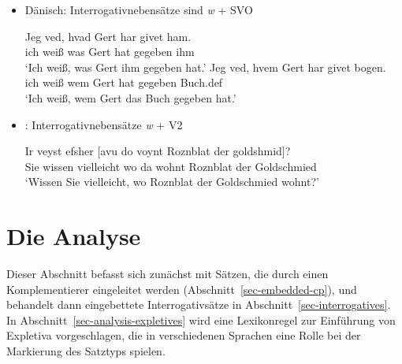 \begin{itemize}
\item Dänisch: Interrogativnebensätze sind \emph{w} + SVO

\eal
\ex
\gll Jeg ved, hvad Gert har givet ham.\\
     ich weiß was Gert  hat gegeben ihm\\
\glt `Ich weiß, was Gert ihm gegeben hat.'
\ex
\gll Jeg ved, hvem Gert har givet   bogen.\\
     ich weiß wem  Gert hat gegeben Buch.{\sc def}\\
\glt `Ich weiß, wem Gert das Buch gegeben hat.'
\zl

\end{itemize}

\begin{itemize}
\item {}: Interrogativnebensätze \emph{w} + V2 \citep[Abschnitte~4.1, 4.2]{Diesing90a}



\ea
\gll Ir veyst efsher [avu            do    voynt Roznblat   der goldshmid]?\footnotemark\\
     Sie wissen vielleicht  \spacebr{}wo da wohnt Roznblat der Goldschmied\\
\glt `Wissen Sie vielleicht, wo Roznblat der Goldschmied wohnt?' 
\z
\end{itemize}

\fi

\section{Die Analyse}

Dieser Abschnitt befasst sich zunächst mit Sätzen, die durch einen Komplementierer eingeleitet werden
(Abschnitt~\ref{sec-embedded-cp}), und behandelt dann eingebettete Interrogativsätze in
Abschnitt~\ref{sec-interrogatives}. In Abschnitt~\ref{sec-analysis-expletives} wird eine Lexikonregel zur
Einführung von Expletiva vorgeschlagen, die in verschiedenen Sprachen eine Rolle bei der Markierung des Satztyps spielen.

